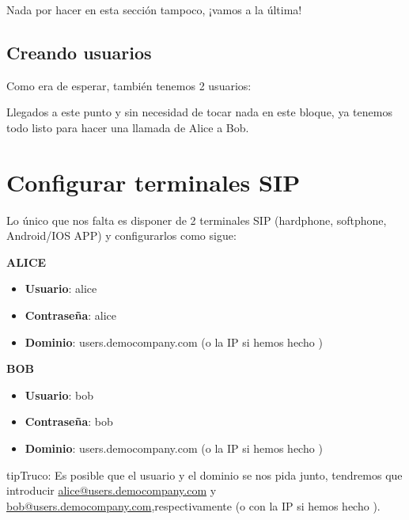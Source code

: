\documentclass[letterpaper,10pt,spanish]{sphinxmanual}
\begin{document}
\noindent{}

Nada por hacer en esta sección tampoco, ¡vamos a la última!


\subsection{Creando usuarios}
\label{internal_calls/company_portal:creating-users}
Como era de esperar, también tenemos 2 usuarios:

\noindent{}

Llegados a este punto y sin necesidad de tocar nada en este bloque, ya tenemos todo listo para hacer una llamada de Alice a Bob.


\section{Configurar terminales SIP}
\label{internal_calls/configure_sipuacs:sip-terminal-configuration}\label{internal_calls/configure_sipuacs::doc}
Lo único que nos falta es disponer de 2 terminales SIP (hardphone, softphone, Android/IOS APP) y configurarlos como sigue:

\textbf{ALICE}
\begin{itemize}
\item {} 
\textbf{Usuario}: alice

\item {} 
\textbf{Contraseña}: alice

\item {} 
\textbf{Dominio}: users.democompany.com (o la IP si hemos hecho {\hyperref[internal_calls/brand_portal:dnshack]{}})

\end{itemize}

\textbf{BOB}
\begin{itemize}
\item {} 
\textbf{Usuario}: bob

\item {} 
\textbf{Contraseña}: bob

\item {} 
\textbf{Dominio}: users.democompany.com (o la IP si hemos hecho {\hyperref[internal_calls/brand_portal:dnshack]{}})

\end{itemize}

\begin{notice}{tip}{Truco:}
Es posible que el usuario y el dominio se nos pida junto, tendremos que introducir \href{mailto:alice@users.democompany.com}{alice@users.democompany.com} y \href{mailto:bob@users.democompany.com}{bob@users.democompany.com},respectivamente (o con la IP si hemos hecho {\hyperref[internal_calls/brand_portal:dnshack]{}}).
\end{notice}
\end{document}
